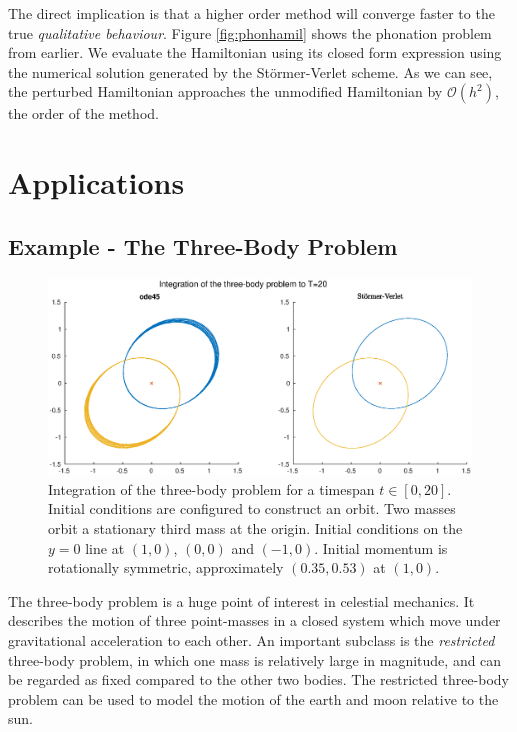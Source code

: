 The direct implication is that a higher order method will converge faster to the true \textit{qualitative behaviour}.
Figure \ref{fig:phonhamil} shows the phonation problem from earlier.
We evaluate the Hamiltonian using its closed form expression using the numerical solution generated by the St\"ormer-Verlet scheme.
As we can see, the perturbed Hamiltonian approaches the unmodified Hamiltonian by $\mathcal{O}(h^2)$, the order of the method.

\section{Applications}

\subsection{Example - The Three-Body Problem}

\begin{figure}
	\centering
	\includegraphics[width=\linewidth]{Matlab/threebodyorbit}
	\caption{
		Integration of the three-body problem for a timespan $t \in [0, 20]$.
		Initial conditions are configured to construct an orbit.
		Two masses orbit a stationary third mass at the origin.
		Initial conditions on the $y=0$ line at $(1,0)$, $(0,0)$ and $(-1,0)$.
		Initial momentum is rotationally symmetric, approximately $(0.35, 0.53)$ at $(1,0)$.
	}
	\label{fig:threebody}
\end{figure}

The three-body problem \cite{musielak2014three} is a huge point of interest in celestial mechanics.
It describes the motion of three point-masses in a closed system which move under gravitational acceleration to each other.
An important subclass is the \textit{restricted} three-body problem, in which one mass is relatively large in magnitude, and can be regarded as fixed compared to the other two bodies.
The restricted three-body problem can be used to model the motion of the earth and moon relative to the sun.

